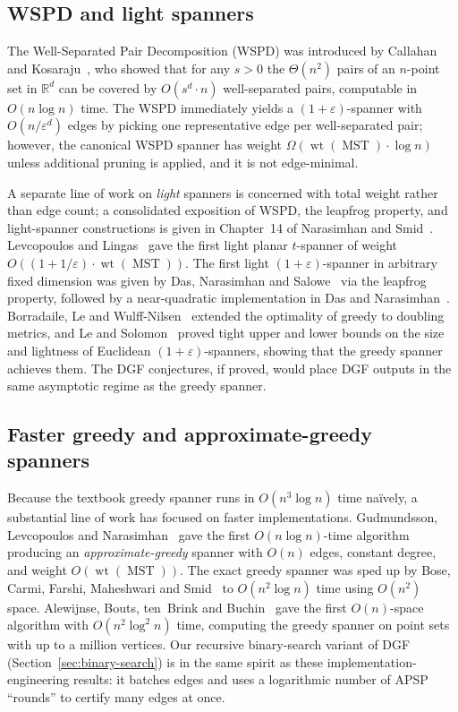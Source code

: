 \documentclass{article}
\DeclareMathOperator{\wt}{wt}
\DeclareMathOperator{\MST}{MST}
\begin{document}
\subsection{WSPD and light spanners}
\label{subsec:rw-wspd}

The Well-Separated Pair Decomposition (WSPD) was introduced by Callahan
and Kosaraju~\cite{CK95}, who showed that for any $s>0$ the $\Theta(n^2)$
pairs of an $n$-point set in $\mathbb{R}^d$ can be covered by
$O(s^d\cdot n)$ well-separated pairs, computable in $O(n\log n)$ time.
The WSPD immediately yields a $(1+\varepsilon)$-spanner with
$O(n/\varepsilon^d)$ edges by picking one representative edge per
well-separated pair; however, the canonical WSPD spanner has weight
$\Omega(\wt(\MST)\cdot\log n)$ unless additional pruning
is applied, and it is not edge-minimal.

A separate line of work on \emph{light} spanners is concerned with
total weight rather than edge count; a consolidated exposition of
WSPD, the leapfrog property, and light-spanner constructions is given
in Chapter~14 of Narasimhan and Smid~\cite{NS07}. Levcopoulos and
Lingas~\cite{LL92} gave the first light planar $t$-spanner of weight
$O((1+1/\varepsilon)\cdot \wt(\MST))$. The first light
$(1+\varepsilon)$-spanner in arbitrary fixed dimension was given by
Das, Narasimhan and Salowe~\cite{DNS95} via the leapfrog property,
followed by a near-quadratic implementation in Das and
Narasimhan~\cite{DN97}. Borradaile, Le and Wulff-Nilsen~\cite{BLW19}
extended the optimality of greedy to doubling metrics, and Le and
Solomon~\cite{LS25} proved tight upper and lower bounds on the size
and lightness of Euclidean $(1+\varepsilon)$-spanners, showing that
the greedy spanner achieves them. The DGF conjectures, if proved,
would place DGF outputs in the same asymptotic regime as the greedy
spanner.

\subsection{Faster greedy and approximate-greedy spanners}
\label{subsec:rw-faster}

Because the textbook greedy spanner runs in $O(n^3 \log n)$ time
na\"ively, a substantial line of work has focused on faster
implementations. Gudmundsson, Levcopoulos and Narasimhan~\cite{GLN02}
gave the first $O(n\log n)$-time algorithm producing an
\emph{approximate-greedy} spanner with $O(n)$ edges, constant degree,
and weight $O(\wt(\MST))$. The exact greedy spanner was
sped up by Bose, Carmi, Farshi, Maheshwari and Smid~\cite{BCFMS10} to
$O(n^2\log n)$ time using $O(n^2)$ space. Alewijnse, Bouts, ten~Brink
and Buchin~\cite{ABBB15} gave the first $O(n)$-space algorithm with
$O(n^2\log^2 n)$ time, computing the greedy spanner on point sets with
up to a million vertices. Our recursive binary-search variant of DGF
(Section~\ref{sec:binary-search}) is in the same spirit as these
implementation-engineering results: it batches edges and uses a
logarithmic number of APSP ``rounds'' to certify many edges at once.
\end{document}
